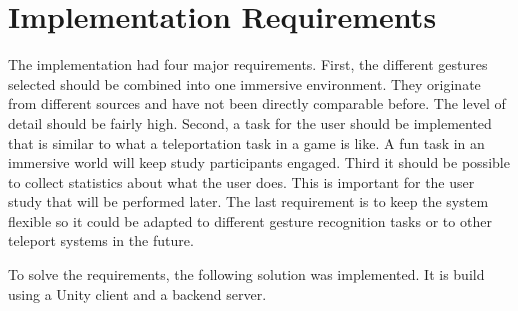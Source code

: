 \chapter{Implementation Requirements}
The implementation had four major requirements. First, the different gestures selected should be combined into one immersive environment. They originate from different sources and have not been directly comparable before. The level of detail should be fairly high. Second, a task for the user should be implemented that is similar to what a teleportation task in a game is like. A fun task in an immersive world will keep study participants engaged. Third it should be possible to collect statistics about what the user does. This is important for the user study that will be performed later. The last requirement is to keep the system flexible so it could be adapted to different gesture recognition tasks or to other teleport systems in the future.

To solve the requirements, the following solution was implemented. It is build using a Unity client and a backend server.